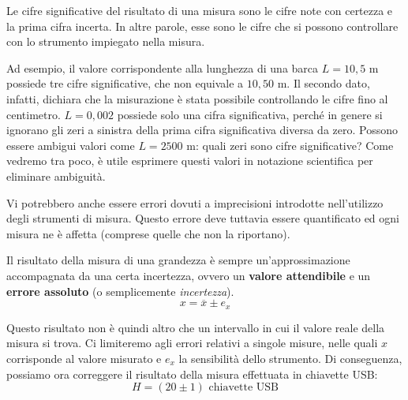 \vspace{8pt}
\begin{tcolorbox}[colback = yellow!30, colframe = yellow!30!black, title = {Cifre significative del risultato di una misura}]
Le cifre significative del risultato di una misura sono le cifre note
con certezza e la prima cifra incerta. In altre parole, esse sono le cifre che si
possono controllare con lo strumento impiegato nella misura.
\end{tcolorbox}
\vspace{5pt}

Ad esempio, il valore corrispondente alla lunghezza di una barca $L = 10,5$ m
possiede tre cifre significative, che non equivale a $10,50$ m. Il secondo dato,
infatti, dichiara che la misurazione è stata possibile controllando le cifre
fino al centimetro. $L = 0,002$ possiede solo una cifra significativa, perché
in genere si ignorano gli zeri a sinistra della prima cifra significativa diversa
da zero. Possono essere ambigui valori come $L = 2500 \text{ m}$: quali zeri sono
cifre significative? Come vedremo tra poco, è utile esprimere questi valori in
notazione scientifica per eliminare ambiguità.

Vi potrebbero anche essere errori dovuti a imprecisioni introdotte nell'utilizzo
degli strumenti di misura. Questo errore deve tuttavia essere quantificato ed ogni
misura ne è affetta (comprese quelle che non la riportano).

\vspace{8pt}
\begin{tcolorbox}[colback = yellow!30, colframe = yellow!30!black, title = {Risultato della misura di una grandezza}]
Il risultato della misura di una grandezza è sempre un'approssimazione
accompagnata da una certa incertezza, ovvero un \textbf{valore attendibile}
e un \textbf{errore assoluto} (o semplicemente \textit{incertezza}).
\[ x = \overline{x} \pm e_x  \]
\end{tcolorbox}
\vspace{5pt}

Questo risultato non è quindi altro che un intervallo in cui il valore reale
della misura si trova. Ci limiteremo agli errori relativi a singole misure,
nelle quali $x$ corrisponde al valore misurato e $e_x$ la sensibilità dello
strumento. Di conseguenza, possiamo ora correggere il risultato della misura
effettuata in chiavette USB:
\[ H = (20 \pm 1) \text{ chiavette USB} \]


